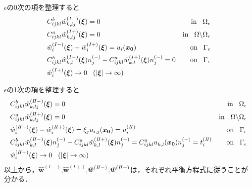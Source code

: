 $\epsilon$の0次の項を整理すると
\begin{align}
&C_{ijkl}^{b} \hat{w}^{(I-)}_{k,lj}(\bm{\xi})=0&\text{in}\hspace{0.3cm}\Omega_{\epsilon}
\label{eq:GovDisturIn1}
\\
&C_{ijkl}^{a} \hat{w}^{(I+)}_{k,lj}(\bm{\xi})=0&\text{in}\hspace{0.3cm}\Omega\backslash\Omega_{\epsilon}
\label{eq:GovDisturOut1}
\\
&\hat{w}_{i}^{(I-)}(\bm{\xi})-\hat{w}_{i}^{(I+)}(\bm{\xi})=u_{i}(\bm{x_0}) &\text{on}\hspace{0.3cm}\Gamma_{\epsilon}
\label{eq:GovDisturUBC1}
\\
&C_{ijkl}^{b}\hat{w}_{k,l}^{(I-)}(\bm{\xi})n_{j}^{(-)}
-C_{ijkl}^{a}\hat{w}_{k,l}^{(I+)}(\bm{\xi})n_{j}^{(-)}=0 &\text{on}\hspace{0.3cm}\Gamma_{\epsilon}
\label{eq:GovDisturSBC1}
\\
&\hat{w}_{i}^{(I+)}(\bm{\xi})\rightarrow 0 \hspace{0.3cm} (|\bm{\xi}|\rightarrow \infty)
\label{eq:GovDisturInftyBC1}
\end{align}

$\epsilon$の1次の項を整理すると
\begin{align}
&C_{ijkl}^{b} \hat{w}^{(I\hspace{-.15em}I-)}_{k,lj}(\bm{\xi})=0
&\text{in}\hspace{0.3cm}\Omega_{\epsilon}
\label{eq:GovDisturIn2}
\\
&C_{ijkl}^{a} \hat{w}^{(I\hspace{-.15em}I+)}_{k,lj}(\bm{\xi})=0
&\text{in}\hspace{0.3cm}\Omega\backslash\Omega_{\epsilon}
\label{eq:GovDisturOut2}
\\
&\hat{w}_{i}^{(I\hspace{-.15em}I-)}(\bm{\xi})
-\hat{w}_{i}^{(I\hspace{-.15em}I+)}(\bm{\xi})= \xi_j u_{i,j}(\bm{x_0})=u_{i}^{(I\hspace{-.15em}I)} &\text{on}\hspace{0.3cm}\Gamma_{\epsilon}
\label{eq:GovDisturUBC2}
\\
&C_{ijkl}^{b}\hat{w}_{k,l}^{(I\hspace{-.15em}I-)}(\bm{\xi})n_{j}^{(-)}
-C_{ijkl}^{a}\hat{w}_{k,l}^{(I\hspace{-.15em}I+)}(\bm{\xi})n_{j}^{(-)}
=C_{ijkl}^{a} u_{k,l}^{}(\bm{x_0})n_{j}^{(-)}=t_{i}^{(I\hspace{-.15em}I)} &\text{on}\hspace{0.3cm}\Gamma_{\epsilon}
\label{eq:GovDisturSBC2}
\\
&\hat{w}_{i}^{(I\hspace{-.15em}I+)}(\bm{\xi})\rightarrow 0 \hspace{0.3cm} (|\bm{\xi}|\rightarrow \infty)
\label{eq:GovDisturInftyBC2}
\end{align}
以上から，$\hat{\bm{w}}^{(I-)}$,$\hat{\bm{w}}^{(I+)}$,$\hat{\bm{w}}^{(I\hspace{-.15em}I-)}$,$\hat{\bm{w}}^{(I\hspace{-.15em}I+)}$は，それぞれ平衡方程式に従うことが分かる．

\newpage
